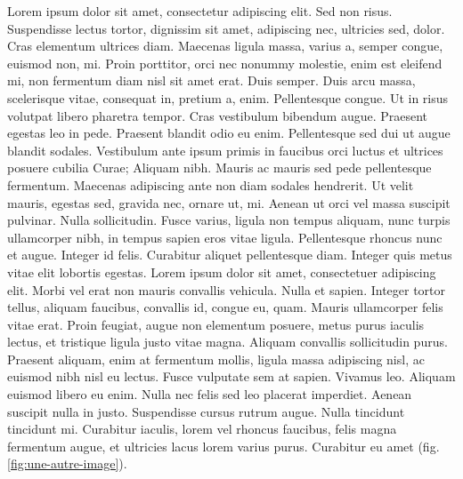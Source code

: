 Lorem ipsum dolor sit amet, consectetur adipiscing elit. Sed non risus. Suspendisse lectus tortor, dignissim sit amet, adipiscing nec, ultricies sed, dolor. Cras elementum ultrices diam. Maecenas ligula massa, varius a, semper congue, euismod non, mi. Proin porttitor, orci nec nonummy molestie, enim est eleifend mi, non fermentum diam nisl sit amet erat. Duis semper. Duis arcu massa, scelerisque vitae, consequat in, pretium a, enim. Pellentesque congue. Ut in risus volutpat libero pharetra tempor. Cras vestibulum bibendum augue. Praesent egestas leo in pede. Praesent blandit odio eu enim. Pellentesque sed dui ut augue blandit sodales. Vestibulum ante ipsum primis in faucibus orci luctus et ultrices posuere cubilia Curae; Aliquam nibh. Mauris ac mauris sed pede pellentesque fermentum. Maecenas adipiscing ante non diam sodales hendrerit. Ut velit mauris, egestas sed, gravida nec, ornare ut, mi. Aenean ut orci vel massa suscipit pulvinar. Nulla sollicitudin. Fusce varius, ligula non tempus aliquam, nunc turpis ullamcorper nibh, in tempus sapien eros vitae ligula. Pellentesque rhoncus nunc et augue. Integer id felis. Curabitur aliquet pellentesque diam. Integer quis metus vitae elit lobortis egestas. Lorem ipsum dolor sit amet, consectetuer adipiscing elit. Morbi vel erat non mauris convallis vehicula. Nulla et sapien. Integer tortor tellus, aliquam faucibus, convallis id, congue eu, quam. Mauris ullamcorper felis vitae erat. Proin feugiat, augue non elementum posuere, metus purus iaculis lectus, et tristique ligula justo vitae magna. Aliquam convallis sollicitudin purus. Praesent aliquam, enim at fermentum mollis, ligula massa adipiscing nisl, ac euismod nibh nisl eu lectus. Fusce vulputate sem at sapien. Vivamus leo. Aliquam euismod libero eu enim. Nulla nec felis sed leo placerat imperdiet. Aenean suscipit nulla in justo. Suspendisse cursus rutrum augue. Nulla tincidunt tincidunt mi. Curabitur iaculis, lorem vel rhoncus faucibus, felis magna fermentum augue, et ultricies lacus lorem varius purus. Curabitur eu amet (fig. \ref{fig:une-autre-image}).

